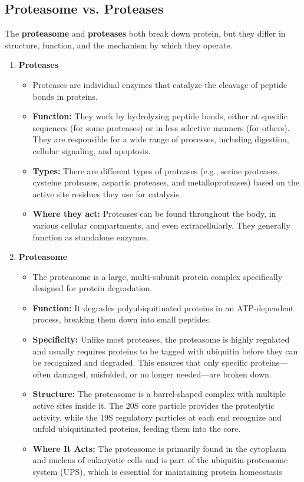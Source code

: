 \documentclass[10pt]{article}
\begin{document}
\subsection*{Proteasome vs. Proteases}
The \textbf{proteasome} and \textbf{proteases} both break down protein, but they differ in structure, function, and the mechanism by which they operate.
\begin{enumerate}
    \item \textbf{Proteases}
    \begin{itemize}
        \item Proteases are individual enzymes that catalyze the cleavage of peptide bonds in proteins.
        \item \textbf{Function:} They work by hydrolyzing peptide bonds, either at specific sequences (for some proteases) or in less selective manners (for others).  They are responsible for a wide range of processes, including digestion, cellular signaling, and apoptosis.
        \item \textbf{Types:} There are different types of proteases (e.g., serine proteases, cysteine proteases, aspartic proteases, and metalloproteases) based on the active site residues they use for catalysis.
        \item \textbf{Where they act:} Proteases can be found throughout the body, in various cellular compartments, and even extracellularly.  They generally function as standalone enzymes.
    \end{itemize}
    \item \textbf{Proteasome}
    \begin{itemize}
        \item The proteasome is a large, multi-subunit protein complex specifically designed for protein degradation.
        \item \textbf{Function:} It degrades polyubiquitinated proteins in an ATP-dependent process, breaking them down into small peptides.
        \item \textbf{Specificity:} Unlike most proteases, the proteasome is highly regulated and usually requires proteins to be tagged with ubiquitin before they can be recognized and degraded. This ensures that only specific proteins—often damaged, misfolded, or no longer needed—are broken down.
        \item \textbf{Structure:} The proteasome is a barrel-shaped complex with multiple active sites inside it. The 20S core particle provides the proteolytic activity, while the 19S regulatory particles at each end recognize and unfold ubiquitinated proteins, feeding them into the core.
        \item \textbf{Where It Acts:} The proteasome is primarily found in the cytoplasm and nucleus of eukaryotic cells and is part of the ubiquitin-proteasome system (UPS), which is essential for maintaining protein homeostasis
    \end{itemize}
\end{enumerate}
\end{document}

